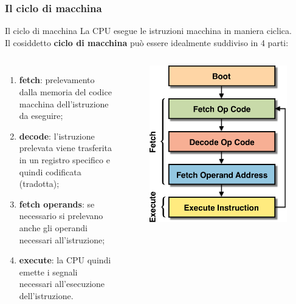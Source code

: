 \begin{frame}
	\frametitle{Il ciclo di macchina}
	
	\begin{block}{Il ciclo di macchina}
		 La CPU esegue le istruzioni macchina in maniera ciclica.\\
		 Il cosiddetto \textbf{ciclo di macchina} può essere idealmente suddiviso in 4 parti:
		 
		\begin{columns}			
			\begin{enumerate}
			 	\item {\color{CpuGreen}\textbf{fetch}}: prelevamento dalla memoria del codice macchina dell’istruzione da eseguire;
			 	\item {\color{CpuRed}\textbf{decode}}: l'istruzione prelevata viene trasferita in un registro specifico e quindi codificata (tradotta);
			 	\item {\color{CpuBlue}\textbf{fetch operands}}: se necessario si prelevano anche gli operandi necessari all'istruzione;
			 	\item {\color{CpuYellow}\textbf{execute}}: la CPU quindi emette i segnali necessari all'esecuzione dell’istruzione.
			 \end{enumerate}
			
			\begin{figure}[!htbp]
				\centering 
				\includegraphics[width=0.95\linewidth]{images/4_cpu/architecture_cpu_cycle.pdf}
			\end{figure} 
		\end{columns}
		 
		 
	\end{block}
	
\end{frame}


